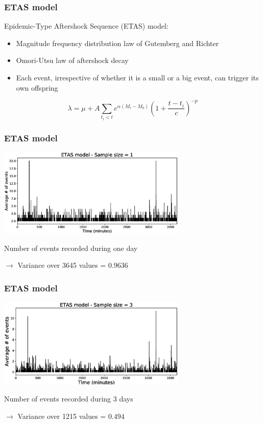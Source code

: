 \documentclass{beamer}
\begin{document}
	\begin{frame}
		\frametitle{ETAS model}
		Epidemic-Type Aftershock Sequence (ETAS) model:
		\begin{itemize}
			\item Magnitude frequency distribution law of Gutemberg and Richter
			\item Omori-Utsu law of aftershock decay
			\item Each event, irrespective of whether it is a small or a big event, can trigger its own offspring
		\end{itemize}
		\begin{equation}
		\lambda = \mu + A \sum_{t_i < t} e^{\alpha \left( M_i - M_0 \right)} \left( 1 + \frac{t - t_i}{c} \right) ^{-p}
		\end{equation}
	\end{frame}

	\begin{frame}
		\frametitle{ETAS model}
		\begin{center}
			\includegraphics[width=9cm, trim={1cm 0cm 3cm 0cm}, clip]{longrange/ETAS_1.eps}
		\end{center}
		Number of events recorded during one day

		$\rightarrow$ Variance over 3645 values = $0.9636$
	\end{frame}

	\begin{frame}
		\frametitle{ETAS model}
		\begin{center}
			\includegraphics[width=9cm, trim={1cm 0cm 3cm 0cm}, clip]{longrange/ETAS_2.eps}
		\end{center}
		Number of events recorded during 3 days

		$\rightarrow$ Variance over 1215 values = $0.494$
	\end{frame}
\end{document}
